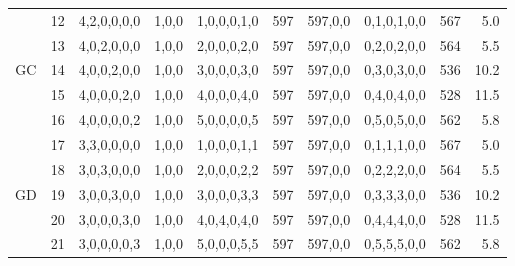 \documentclass[review,12pt, 3p, times]{elsarticle}
\begin{document}
\begin{longtable}{|c|c|c|c|c|c|c|c|c|r|}
																
	\hline
	        & 12      & 4,2,0,0,0,0                         & 1,0,0                                & 1,0,0,0,1,0          & 597          & 597,0,0               & 0,1,0,1,0,0                                & 567                     & 5.0        \\
	        & 13      & 4,0,2,0,0,0                         & 1,0,0                                & 2,0,0,0,2,0          & 597          & 597,0,0               & 0,2,0,2,0,0                                & 564                     & 5.5        \\
	GC      & 14      & 4,0,0,2,0,0                         & 1,0,0                                & 3,0,0,0,3,0          & 597          & 597,0,0               & 0,3,0,3,0,0                                & 536                     & 10.2       \\
	        & 15      & 4,0,0,0,2,0                         & 1,0,0                                & 4,0,0,0,4,0          & 597          & 597,0,0               & 0,4,0,4,0,0                                & 528                     & 11.5       \\
	        & 16      & 4,0,0,0,0,2                         & 1,0,0                                & 5,0,0,0,0,5          & 597          & 597,0,0               & 0,5,0,5,0,0                                & 562                     & 5.8        \\
	\hline
	        & 17      & 3,3,0,0,0,0                         & 1,0,0                                & 1,0,0,0,1,1          & 597          & 597,0,0               & 0,1,1,1,0,0                                & 567                     & 5.0        \\
	        & 18      & 3,0,3,0,0,0                         & 1,0,0                                & 2,0,0,0,2,2          & 597          & 597,0,0               & 0,2,2,2,0,0                                & 564                     & 5.5        \\
	GD      & 19      & 3,0,0,3,0,0                         & 1,0,0                                & 3,0,0,0,3,3          & 597          & 597,0,0               & 0,3,3,3,0,0                                & 536                     & 10.2       \\
	        & 20      & 3,0,0,0,3,0                         & 1,0,0                                & 4,0,4,0,4,0          & 597          & 597,0,0               & 0,4,4,4,0,0                                & 528                     & 11.5       \\
	        & 21      & 3,0,0,0,0,3                         & 1,0,0                                & 5,0,0,0,5,5          & 597          & 597,0,0               & 0,5,5,5,0,0                                & 562                     & 5.8        \\

\end{longtable}
\end{document}
